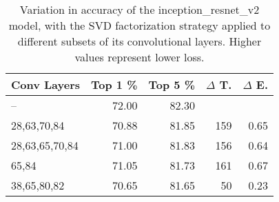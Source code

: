 \begin{table}
\centering
\begin{tabular}{|l|r|r|r|r|}
\hline
Conv Layers & Top 1 \% & Top 5 \% & $\Delta$ T. & $\Delta$ E. \\\hline
-- & 72.00 & 82.30 &  & \\\hline
28,63,70,84 & 70.88 & 81.85 & 159 & 0.65 \\\hline
28,63,65,70,84 & 71.00 & 81.83 & 156 & 0.64 \\\hline
65,84 & 71.05 & 81.73 & 161 & 0.67 \\\hline
38,65,80,82 & 70.65 & 81.65 & 50 & 0.23 \\\hline
\end{tabular}
\caption{Variation in accuracy of the inception\_resnet\_v2 model, with the SVD factorization strategy applied to different subsets of its convolutional layers. Higher values represent lower loss.}
\label{inception_resnet_v2-accuracy}
\end{table}
